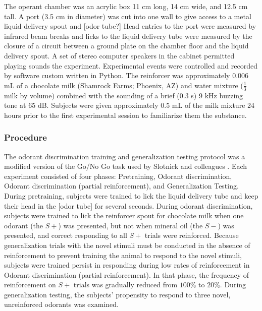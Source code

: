 The operant chamber was an acrylic box 11 cm long, 14 cm wide, and 12.5 cm tall. A port (3.5 cm in diameter) was cut into one wall to give access to a metal liquid delivery spout and [odor tube?] Head entries to the port were measured by infrared beam breaks and licks to the liquid delivery tube were measured by the closure of a circuit between a ground plate on the chamber floor and the liquid delivery spout. A set of stereo computer speakers in the cabinet permitted playing sounds the experiment.  Experimental events were controlled and recorded by software custom written in Python.
The reinforcer was approximately 0.006 mL of a chocolate milk (Shamrock Farms; Phoenix, AZ) and water mixture ($\frac{1}{3}$ milk by volume) combined with the sounding of a brief (0.3 s) 9 kHz buzzing tone at 65 dB. Subjects were given approximately 0.5 mL of the milk mixture 24 hours prior to the first experimental session to familiarize them the substance.  

\subsubsection{Procedure}
\label{sec:methods_procedure}
The odorant discrimination training and generalization testing protocol was a modified version of the Go/No Go task used by Slotnick and colleagues \cite{18428626}. Each experiment consisted of four phases: Pretraining, Odorant discrimination, Odorant discrimination (partial reinforcement), and Generalization Testing. During pretraining, subjects were trained to lick the liquid delivery tube and keep their head in the [odor tube] for several seconds. During odorant discrimination, subjects were trained to lick the reinforcer spout for chocolate milk when one odorant (the $S+$) was presented, but not when mineral oil (the $S-$) was presented, and correct responding to all $S+$ trials were reinforced. Because generalization trials with the novel stimuli must be conducted in the absence of reinforcement to prevent training the animal to respond to the novel stimuli, subjects were trained persist in responding during low rates of reinforcement in Odorant discrimination (partial reinforcement). In that phase, the frequency of reinforcement on $S+$ trials was gradually reduced from $100\%$ to $20\%$. During generalization testing, the subjects' propensity to respond to three novel, unreinforced odorants was examined.


